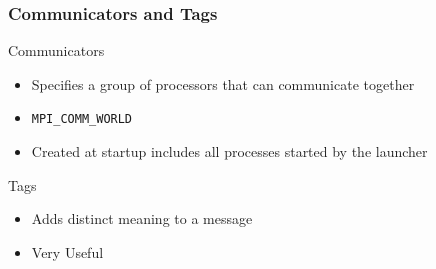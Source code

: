 \documentclass[handout]{beamer}
\begin{document}
\begin{frame}
 \frametitle{Communicators and Tags}
  \begin{block}{Communicators}
   \begin{itemize}
     \item<1->Specifies a group of processors that can communicate together
     \item<2->\texttt{MPI\_COMM\_WORLD}
     \item<2->Created at startup includes all processes started by the launcher
   \end{itemize}
  \end{block}
  \begin{block}{Tags}
    \begin{itemize}
     \item<3->Adds distinct meaning to a message
     \item<4->Very Useful
    \end{itemize}
  \end{block}

\end{frame}
\end{document}
